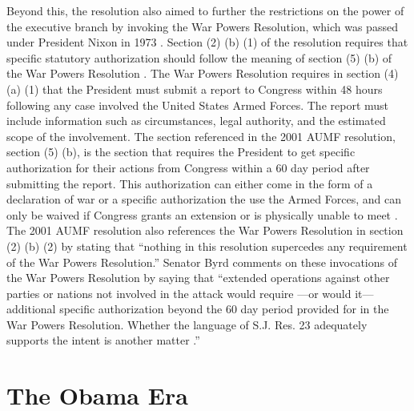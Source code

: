 \documentclass[12pt]{article}
\begin{document}
Beyond this, the resolution also aimed to further the restrictions on the power of the executive branch by invoking the War Powers Resolution, which was passed under President Nixon in 1973 \autocite{zotero-176}.
Section (2) (b) (1) of the resolution requires that specific statutory authorization should follow the meaning of section (5) (b) of the War Powers Resolution \autocite{daschle2001}.
The War Powers Resolution requires in section (4) (a) (1) that the President must submit a report to Congress within 48 hours following any case involved the United States Armed Forces.
The report must include information such as circumstances, legal authority, and the estimated scope of the involvement.
The section referenced in the 2001 AUMF resolution, section (5) (b), is the section that requires the President to get specific authorization for their actions from Congress within a 60 day period after submitting the report.
This authorization can either come in the form of a declaration of war or a specific authorization the use the Armed Forces, and can only be waived if Congress grants an extension or is physically unable to meet \autocite{zablocki1973}.
The 2001 AUMF resolution also references the War Powers Resolution in section (2) (b) (2) by stating that ``nothing in this resolution supercedes any requirement of the War Powers Resolution.''
Senator Byrd comments on these invocations of the War Powers Resolution by saying that ``extended operations against other parties or nations not involved in the attack would require —or would it— additional specific authorization beyond the 60 day period provided for in the War Powers Resolution. Whether the language of S.J. Res. 23 adequately supports the intent is another matter \autocite[SS950]{byrd2001a}.''

\section*{The Obama Era}
\end{document}
